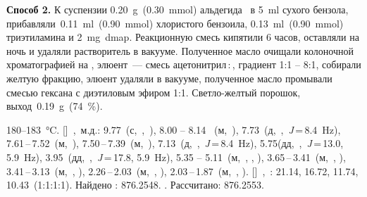 \textbf{Способ 2.} К суспензии \SI{0.20}{\gram}~(\SI{0.30}{\mmol}) альдегида~\textbf{} в \SI{5}{\milli\litre} сухого бензола, прибавляли~\SI{0.11}{\milli\litre}~(\SI{0.90}{\mmol}) хлористого бензоила, \SI{0.13}{\milli\litre}~(\SI{0.90}{\mmol}) триэтиламина и \SI{2}{\milli\gram}~\ac{dmap}.
Реакционную смесь кипятили 6 часов, оставляли на ночь и удаляли растворитель в вакууме.
Полученное масло очищали колоночной хроматографией на , элюент~--- смесь ацетонитрил\,:\,, градиент 1:1 -- 8:1, собирали желтую фракцию, элюент удаляли в вакууме, полученное масло промывали смесью гексана с диэтиловым эфиром 1:1. Светло-желтый порошок, выход~\SI{0.19}{\gram}~(\SI{74}{\percent}).
\begin{experimental}
     180--\SI{183}{\celsius}.
    []~\chemdelta,~м.д.: 9.77~(с,~,~), 8.00 -- 8.14 ~(м,~), 7.73~(д,~,~\textit{J}\,=\,8.4~\si{\hertz}), 7.61\,--\,7.52~(м,~), 7.50\,--\,7.39~(м,~), 7.13~(д,~,~\textit{J}\,=\,8.4~\si{\hertz}), 5.75(дд,~,~\textit{J}\,=\,13.0, 5.9~\si{\hertz}), 3.95~(дд,~,~\textit{J}\,=\,17.8, 5.9~\si{\hertz}), 5.35 -- 5.11~(м,~, , ), 3.65\,--\,3.41~(м,~, ), 3.41\,--\,3.13~(м,~, ), 2.26\,--\,2.03~(м,~, ), 2.03\,--\,1.87~(м,~, ).
    []~\chemdelta,~\si{\ppm}: 21.14, 16.72, 11.74, 10.43~(1:1:1:1).
     Найдено \ce{[M+]}: \num{876.2548}. . Рассчитано:  \num{876.2553}.
\end{experimental}

